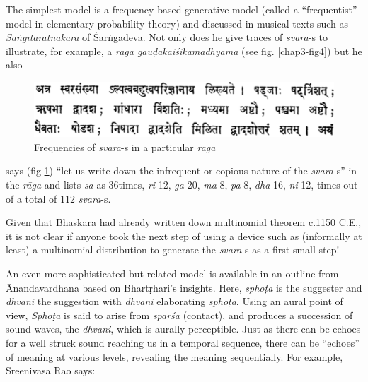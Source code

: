 The simplest model is a frequency based generative model (called a “frequentist” model in elementary probability theory) and discussed in musical texts such as \textsl{Saṅgītaratnākara} of Śārṅgadeva. Not only does he give traces of \textsl{svara}-s to illustrate, for example, a \textsl{rāga gauḍakaiśikamadhyama} (see fig. \ref{chap3-fig4}) but he also 
\begin{figure}[H]
\centering
\includegraphics[scale=.35]{figures/5.eps}
\caption{Frequencies of \textsl{svara}-s in a particular \textsl{rāga}}\label{chap3-fig3}
\end{figure}
says (fig \ref{chap3-fig3}) “let us write down the infrequent or copious nature of the \textsl{svara}-s” in the \textsl{rāga} and lists \textsl{sa} as 36times, \textsl{ri} 12, \textsl{ga} 20, \textsl{ma} 8, \textsl{pa} 8, \textsl{dha} 16, \textsl{ni} 12, times out of a total of 112 \textsl{svara}-s. 

Given that Bhāskara had already written down multinomial theorem c.1150 C.E., it is not clear if anyone took the next step of using a device such as (informally at least) a multinomial distribution to generate the \textsl{svara}-s as a first small step!

An even more sophisticated but related model is available in an outline from Ānandavardhana based on Bhartṛhari's insights. Here, \textsl{sphoṭa} is the suggester and \textsl{dhvani} the suggestion with \textsl{dhvani} elaborating \textsl{sphoṭa}. Using an aural point of view, \textsl{Sphoṭa} is said to arise from \textsl{sparśa} (contact), and produces a succession of sound waves, the \textsl{dhvani}, which is aurally perceptible. Just as there can be echoes for a well struck sound reaching us in a temporal sequence, there can be “echoes” of meaning at various levels, revealing the meaning sequentially. For example, Sreenivasa Rao says:

